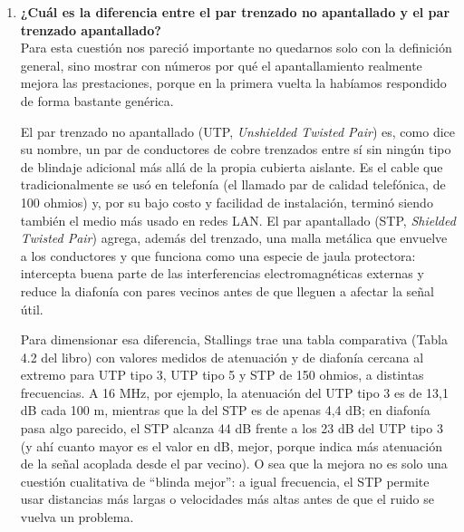 \documentclass[11pt,a4paper]{article}
\begin{document}
\begin{enumerate}[label=4.\arabic*), itemsep=0.3cm]
        Finalmente, el \textbf{efecto pelicular (\textit{skin effect})} hace que, a frecuencias elevadas, la corriente se concentre en una región más superficial del conductor, aumentando su resistencia efectiva. Junto con las pérdidas dieléctricas y la diafonía, contribuye a limitar las frecuencias que pueden transmitirse con una calidad aceptable.

        En conclusión, las principales limitaciones del par trenzado son la atenuación, la susceptibilidad al ruido y las interferencias, la diafonía y las pérdidas que aumentan con la frecuencia. Estos factores condicionan la distancia máxima del enlace y la velocidad de transmisión alcanzable.
  \item
        \textbf{¿Cuál es la diferencia entre el par trenzado no apantallado y el par trenzado apantallado?} \\

        Para esta cuestión nos pareció importante no quedarnos solo con la definición general, sino mostrar con números por qué el apantallamiento realmente mejora las prestaciones, porque en la primera vuelta la habíamos respondido de forma bastante genérica.

        El par trenzado no apantallado (UTP, \textit{Unshielded Twisted Pair}) es, como dice su nombre, un par de conductores de cobre trenzados entre sí sin ningún tipo de blindaje adicional más allá de la propia cubierta aislante. Es el cable que tradicionalmente se usó en telefonía (el llamado par de calidad telefónica, de 100 ohmios) y, por su bajo costo y facilidad de instalación, terminó siendo también el medio más usado en redes LAN. El par apantallado (STP, \textit{Shielded Twisted Pair}) agrega, además del trenzado, una malla metálica que envuelve a los conductores y que funciona como una especie de jaula protectora: intercepta buena parte de las interferencias electromagnéticas externas y reduce la diafonía con pares vecinos antes de que lleguen a afectar la señal útil.

        Para dimensionar esa diferencia, Stallings trae una tabla comparativa (Tabla 4.2 del libro) con valores medidos de atenuación y de diafonía cercana al extremo para UTP tipo 3, UTP tipo 5 y STP de 150 ohmios, a distintas frecuencias. A 16 MHz, por ejemplo, la atenuación del UTP tipo 3 es de 13,1 dB cada 100 m, mientras que la del STP es de apenas 4,4 dB; en diafonía pasa algo parecido, el STP alcanza 44 dB frente a los 23 dB del UTP tipo 3 (y ahí cuanto mayor es el valor en dB, mejor, porque indica más atenuación de la señal acoplada desde el par vecino). O sea que la mejora no es solo una cuestión cualitativa de ``blinda mejor'': a igual frecuencia, el STP permite usar distancias más largas o velocidades más altas antes de que el ruido se vuelva un problema.


\end{enumerate}
\end{document}
